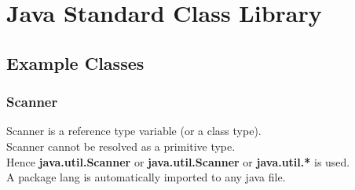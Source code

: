 \documentclass[12pt]{article}
\begin{document}
\section{Java Standard Class Library}
\subsection{Example Classes}
\subsubsection{Scanner}
Scanner is a reference type variable (or a class type). \\
Scanner cannot be resolved as a primitive type.\\
Hence \textbf{java.util.Scanner} or \textbf{java.util.Scanner} or \textbf{java.util.*} is used. \\
A package lang is automatically imported to any java file.
\end{document}
